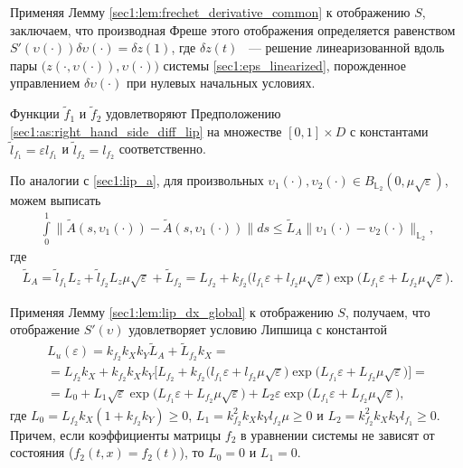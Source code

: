 \documentclass[../main.tex]{subfiles}
\begin{document}
Применяя Лемму \ref{sec1:lem:frechet_derivative_common} к отображению $S$, заключаем, что производная Фреше этого отображения определяется равенством $ S'(\upsilon(\cdot))\delta \upsilon(\cdot) = \delta z(1)$, где $\delta z(t)$ ~--- решение линеаризованной вдоль пары $\big( z(\cdot,\upsilon(\cdot)),\upsilon(\cdot)\big)  $ системы \eqref{sec1:eps_linearized}, порожденное управлением $\delta \upsilon(\cdot)$ при нулевых начальных условиях.
 
Функции  $\widetilde{f}_1$ и $\widetilde{f}_2$ удовлетворяют Предположению \ref{sec1:as:right_hand_side_diff_lip} на множестве $[0, 1]\times D$ с константами $\widetilde{l}_{f_1} = \varepsilon l_{f_1} $ и  $\widetilde{l}_{f_2} = l_{f_2} $ соответственно. 
  
По аналогии с \eqref{sec1:lip_a}, для произвольных $ \upsilon_1(\cdot), \upsilon_2(\cdot) \in B_{\mathbb{L}_2}(0,\mu\sqrt{\varepsilon})$, можем выписать
\begin{gather*}
      \int\limits_{0}^{1} \|\widetilde{A}(s, \upsilon_1(\cdot)) - \widetilde{A}(s, \upsilon_1(\cdot)) \| ds \leqslant \widetilde{L}_A \| \upsilon_1(\cdot) - \upsilon_2(\cdot) \|_{\mathbb{L}_2},
\end{gather*}
 где 
\begin{gather}\label{sec1:eps_lip_a}
     \widetilde{L}_A = \widetilde{l}_{f_1} L_z  + \widetilde{l}_{f_2} L_z \mu \sqrt{\varepsilon} + \widetilde{L}_{f_2} = 
     L_{f_2} + k_{f_2} \Big( l_{f_1}  \varepsilon  + l_{f_2}  \mu \sqrt{\varepsilon} \Big) \exp\big( L_{f_1} \varepsilon + L_{f_2} \mu \sqrt{\varepsilon} \big).
 \end{gather}
 
 Применяя Лемму \eqref{sec1:lem:lip_dx_global} к отображению $S$, получаем, что отображение $S'(\upsilon)$ удовлетворяет условию Липшица с константой 
 \begin{gather*}
     L_u(\varepsilon) = k_{f_2} k_X k_Y \widetilde{L}_A + \widetilde{L}_{f_2} k_X  = \\ = 
      L_{f_2} k_X + 
      k_{f_2} k_X k_Y \Big[ L_{f_2} + k_{f_2} \Big( l_{f_1}  \varepsilon  + l_{f_2}  \mu \sqrt{\varepsilon} \Big) \exp\big( L_{f_1} \varepsilon + L_{f_2} \mu \sqrt{\varepsilon} \big) \Big] = \\ =
     L_0 + L_1 \sqrt{\varepsilon} \exp\big( L_{f_1} \varepsilon + L_{f_2} \mu \sqrt{\varepsilon} \big) + L_2 \varepsilon \exp\big( L_{f_1} \varepsilon + L_{f_2} \mu \sqrt{\varepsilon} \big),
 \end{gather*} 
 где $ L_0 = L_{f_2} k_X (1 + k_{f_2}  k_Y) \geqslant 0$, $L_1 = k_{f_2}^2 k_X k_Y l_{f_2}  \mu \geqslant 0 $ и $L_2 = k_{f_2}^2 k_X k_Y l_{f_1} \geqslant 0 $. 
 Причем, если коэффициенты матрицы $f_2$ в уравнении системы не зависят от состояния ($f_2(t,x) = f_2(t)$), то $L_0 = 0$ и $L_1 = 0$. 
  
\end{document}
